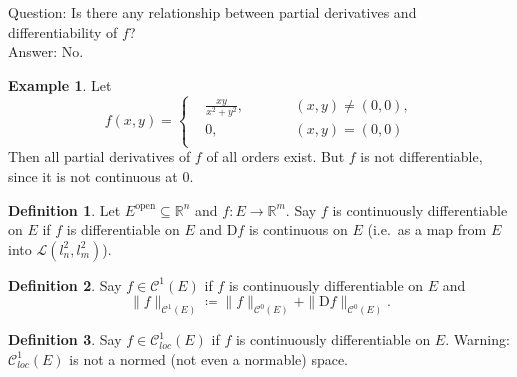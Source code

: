 \documentclass[12pt]{article}
\theoremstyle{plain}
\theoremstyle{definition}
\newtheorem*{defn}{Definition}
\newtheorem*{eg}{Example}
\begin{document}
Question: Is there any relationship between partial derivatives and differentiability of $f$?\\
Answer: No.

\begin{eg}
    Let 
    \[
        f(x, y) = \left\{
            \begin{aligned}
                &\frac{xy}{x^2+y^2},\qquad&&(x,y)\neq(0,0),\\
                &0,&&(x,y) = (0,0)\\
            \end{aligned}
        \right.
    \]
    Then all partial derivatives of $f$ of all orders exist.
    But $f$ is not differentiable, since it is not continuous at $0$.
\end{eg}

\begin{defn}
    Let $E^{\text{open}}\subseteq \mathbb{R}^n$ and $f : E\rightarrow \mathbb{R}^m$.
    Say $f$ is continuously differentiable on $E$ if $f$ is differentiable on $E$ and $\mathrm{D}f$ is continuous on $E$ (i.e.\ as a map from $E$ into
    $\mathcal{L}(l_n^2, l_m^2)$).
\end{defn}
\begin{defn}
    Say $f\in \mathcal{C}^1(E)$ if $f$ is continuously differentiable on $E$ and
    \[
        \|f\|_{\mathcal{C}^1(E)} \coloneqq \|f\|_{\mathcal{C}^0(E)} + \|\mathrm{D}f\|_{\mathcal{C}^0(E)}.
    \]
\end{defn}
\begin{defn}
    Say $f \in \mathcal{C}_{loc}^1(E)$ if $f$ is continuously differentiable on $E$.
    Warning: $\mathcal{C}_{loc}^1(E)$ is not a normed (not even a normable) space.
\end{defn}
\end{document}

